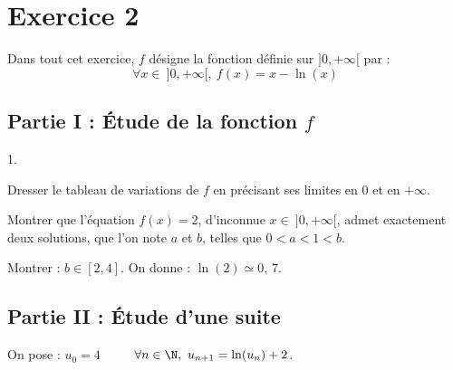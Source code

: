 \documentclass[11pt]{article}%
\begin{document}


\section*{Exercice 2}

\noindent
Dans tout cet exercice, $f$ désigne la fonction définie sur $]0, + 
\infty[$ par :
\[
  \forall x \in \ ]0,+\infty[, \ f(x) = x - \ln(x)
\]

\subsection*{Partie I : Étude de la fonction $f$}

\begin{noliste}{1.}
  \setlength{\itemsep}{4mm}
  \item Dresser le tableau de variations de $f$ en précisant ses 
  limites en $0$ et en $+\infty$.
  
  
  
  \item Montrer que l'équation $f(x)=2$, d'inconnue $x \in \ 
  ]0,+\infty[$, admet exactement deux solutions, que l'on note $a$ et 
  $b$, telles que $0<a<1<b$.
  
  

  
\item Montrer : $b \in [2,4]$. On donne : $\ln(2) \simeq 0, \, 7$.
  
  
\end{noliste}




\subsection*{Partie II : Étude d'une suite}

\noindent
On pose : $u_0=4$ \ \  \ \ $\forall n \in \N, \ u_{n+1} =
\ln(u_n) +2$.
\end{document}
